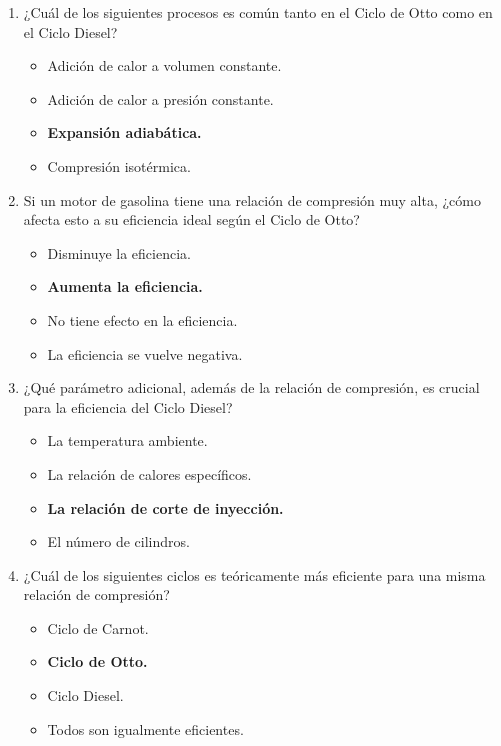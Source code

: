 \documentclass{article}
\begin{document}
\begin{enumerate}[label=\arabic*.]
    \item ¿Cuál de los siguientes procesos es común tanto en el Ciclo de Otto como en el Ciclo Diesel?
    \begin{itemize}[label=\alph*)]
        \item Adición de calor a volumen constante.
        \item Adición de calor a presión constante.
        \item \textbf{Expansión adiabática.}
        \item Compresión isotérmica.
    \end{itemize}

    \item Si un motor de gasolina tiene una relación de compresión muy alta, ¿cómo afecta esto a su eficiencia ideal según el Ciclo de Otto?
    \begin{itemize}[label=\alph*)]
        \item Disminuye la eficiencia.
        \item \textbf{Aumenta la eficiencia.}
        \item No tiene efecto en la eficiencia.
        \item La eficiencia se vuelve negativa.
    \end{itemize}

    \item ¿Qué parámetro adicional, además de la relación de compresión, es crucial para la eficiencia del Ciclo Diesel?
    \begin{itemize}[label=\alph*)]
        \item La temperatura ambiente.
        \item La relación de calores específicos.
        \item \textbf{La relación de corte de inyección.}
        \item El número de cilindros.
    \end{itemize}

    \item ¿Cuál de los siguientes ciclos es teóricamente más eficiente para una misma relación de compresión?
    \begin{itemize}[label=\alph*)]
        \item Ciclo de Carnot.
        \item \textbf{Ciclo de Otto.}
        \item Ciclo Diesel.
        \item Todos son igualmente eficientes.
    \end{itemize}


\end{enumerate}
\end{document}
